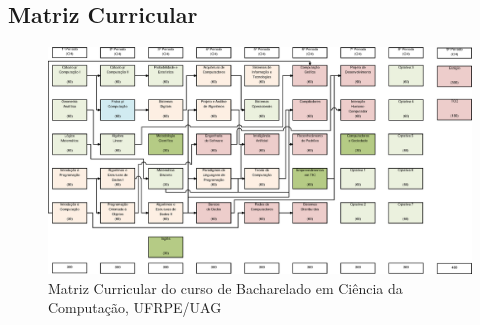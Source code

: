 \documentclass[
	12pt,				%
	openright,			%
  oneside,     %
	a4paper,			%
	chapter=TITLE,		%
	english,			%
	french,				%
	spanish,			%
	brazil				%
	]{abntex2}
\begin{document}
\begin{apendicesenv}

\partapendices

\chapter{Matriz Curricular}

\begin{landscape}
  \begin{figure}[hbtp]
    \centering
      \caption{\label{fig:matrizcurricular}Matriz Curricular do curso de Bacharelado em Ciência da Computação, UFRPE/UAG}
      \includegraphics[width=1.55\textwidth]{images/matriz6.eps}
  \end{figure}
\end{landscape}


\end{apendicesenv}
\end{document}
